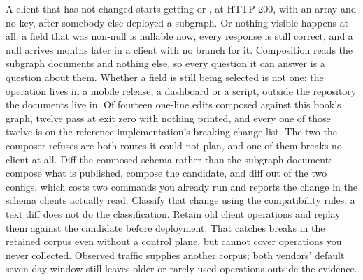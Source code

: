 \begin{problemsummary}
{A client that has not changed starts getting  or
, at HTTP 200, with an  array and no
 key, after somebody else deployed a subgraph. Or nothing visible
happens at all: a field that was non-null is nullable now, every response is
still correct, and a null arrives months later in a client with no branch for
it.}
{Composition reads the subgraph documents and nothing else, so every question
it can answer is a question about them. Whether a field is still being
selected is not one: the operation lives in a mobile release, a dashboard or a
script, outside the repository the documents live in. Of fourteen one-line
edits composed against this book's graph, twelve pass at exit zero with
nothing printed, and every one of those twelve is on the reference
implementation's breaking-change list. The two the composer refuses are both
routes it could not plan, and one of them breaks no client at all.}
{Diff the composed schema rather than the subgraph document: compose what is
published, compose the candidate, and diff 
out of the two configs, which costs two commands you already run and reports
the change in the schema clients actually read. Classify that change using
the compatibility rules; a text diff does not do the classification. Retain
old client operations and replay them against the candidate before deployment.
That catches breaks in the retained corpus even without a control plane, but
cannot cover operations you never collected. Observed traffic supplies another
corpus; both vendors' default seven-day window still leaves older or rarely
used operations outside the evidence.}
\end{problemsummary}
